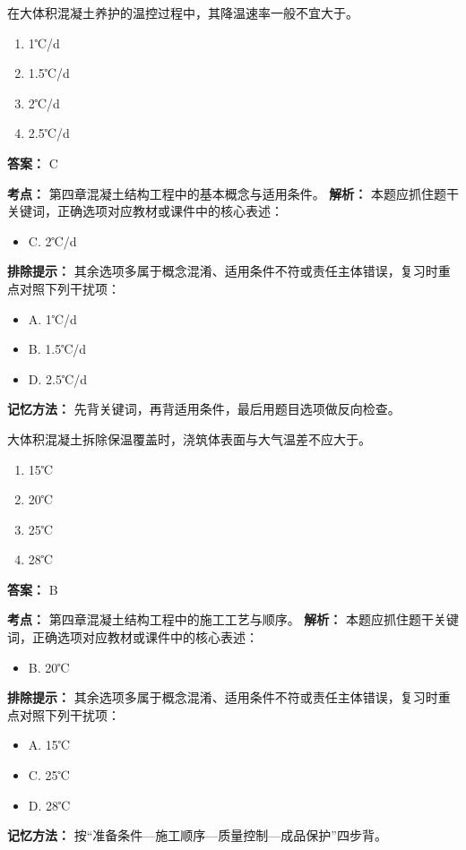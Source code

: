 \documentclass[UTF8,fontset=fandol,11pt]{ctexart}
\begin{document}
\begin{quizbox}[title={第 83 题}]
在大体积混凝土养护的温控过程中，其降温速率一般不宜大于。\\
\begin{enumerate}[label=\Alph*.]
\item 1℃/d
\item 1.5℃/d
\item 2℃/d
\item 2.5℃/d
\end{enumerate}
\textbf{答案：} C
\vspace{0.25em}
\begin{answerbox}[title={考点解析}]
\textbf{考点：} 第四章混凝土结构工程中的基本概念与适用条件。
\textbf{解析：} 本题应抓住题干关键词，正确选项对应教材或课件中的核心表述：
\begin{itemize}
\item C. 2℃/d
\end{itemize}
\textbf{排除提示：} 其余选项多属于概念混淆、适用条件不符或责任主体错误，复习时重点对照下列干扰项：
\begin{itemize}
\item A. 1℃/d
\item B. 1.5℃/d
\item D. 2.5℃/d
\end{itemize}
\textbf{记忆方法：} 先背关键词，再背适用条件，最后用题目选项做反向检查。
\end{answerbox}
\end{quizbox}

\vspace{0.2em}

\begin{quizbox}[title={第 84 题}]
大体积混凝土拆除保温覆盖时，浇筑体表面与大气温差不应大于。\\
\begin{enumerate}[label=\Alph*.]
\item 15℃
\item 20℃
\item 25℃
\item 28℃
\end{enumerate}
\textbf{答案：} B
\vspace{0.25em}
\begin{answerbox}[title={考点解析}]
\textbf{考点：} 第四章混凝土结构工程中的施工工艺与顺序。
\textbf{解析：} 本题应抓住题干关键词，正确选项对应教材或课件中的核心表述：
\begin{itemize}
\item B. 20℃
\end{itemize}
\textbf{排除提示：} 其余选项多属于概念混淆、适用条件不符或责任主体错误，复习时重点对照下列干扰项：
\begin{itemize}
\item A. 15℃
\item C. 25℃
\item D. 28℃
\end{itemize}
\textbf{记忆方法：} 按“准备条件—施工顺序—质量控制—成品保护”四步背。
\end{answerbox}
\end{quizbox}
\end{document}
